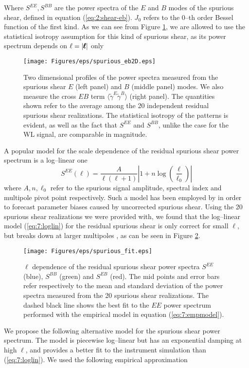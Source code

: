 %
Where $S^{EE}, S^{BB}$ are the power spectra of the $E$ and $B$ modes of the spurious shear, defined in equation (\ref{eq:2:shear-eb}). $J_0$ refers to the 0--th order Bessel function of the first kind. As we can see from Figure \ref{fig:7:eb2d}, we are allowed to use the statistical isotropy assumption for this kind of spurious shear, as its power spectrum depends on $\ell=\vert\pmb{\ell}\vert$ only
%
\begin{figure}
\begin{center}
\texttt{[image: Figures/eps/spurious\_eb2D.eps]}
\end{center}
\caption{Two dimensional profiles of the power spectra measured from the spurious shear $E$ (left panel) and $B$ (middle panel) modes. We also measure the cross $EB$ term $\langle\tilde{\gamma}^E\tilde{\gamma}^B\rangle$ (right panel). The quantities shown refer to the average among the 20 independent residual spurious shear realizations. The statistical isotropy of the patterns is evident, as well as the fact that $S^{EE}$ and $S^{BB}$, unlike the case for the WL signal, are comparable in magnitude.}
\label{fig:7:eb2d}
\end{figure} 
%
A popular model for the scale dependence of the residual spurious shear power spectrum \citep{AmaraSP} is a log--linear one
\begin{equation}
\label{eq:7:loglin}
S^{EE}(\ell) = \frac{A}{\ell(\ell+1)}\left\vert1+n\log\left(\frac{\ell}{\ell_0}\right)\right\vert
\end{equation}
%
where $A,n,\ell_0$ refer to the spurious signal amplitude, spectral index and multipole pivot point respectively. Such a model has been employed by \citep{AmaraSP} in order to forecast parameter biases caused by uncorrected spurious shear. Using the 20 spurious shear realizations we were provided with, we found that the log--linear model (\ref{eq:7:loglin}) for the residual spurious shear is only correct for small $\ell$, but breaks down at larger multipoles \citep{PetriSpShear}, as can be seen in Figure \ref{fig:7:spfit}. 
%
\begin{figure}
\begin{center}
\texttt{[image: Figures/eps/spurious\_fit.eps]}
\end{center}
\caption{$\ell$ dependence of the residual spurious shear power spectra $S^{EE}$ (blue), $S^{BB}$ (green) and $S^{EB}$ (red). The mid points and error bars refer respectively to the mean and standard deviation of the power spectra measured from the 20 spurious shear realizations. The dashed black line shows the best fit to the $EE$ power spectrum performed with the empirical model in equation (\ref{eq:7:empmodel}).}
\label{fig:7:spfit}
\end{figure} 
%
We propose the following alternative model for the spurious shear power spectrum. The model is piecewise log--linear but has an exponential damping at high $\ell$, and provides a better fit to the instrument simulation than (\ref{eq:7:loglin}). We used the following empirical approximation

